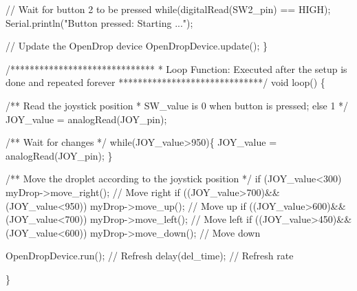 \begin{DoxyCodeInclude}
  // Wait for button 2 to be pressed
  while(digitalRead(SW2\_pin) == HIGH);
  Serial.println("Button pressed: Starting ...");

  // Update the OpenDrop device
  OpenDropDevice.update();
\}

/******************************
 * Loop Function: Executed after the setup is done and repeated forever
 ******************************/
void loop() \{

  /** Read the joystick position
   *  SW\_value is 0 when button is pressed; else 1
   */
  JOY\_value = analogRead(JOY\_pin);

  /** Wait for changes */
  while(JOY\_value>950)\{
   JOY\_value = analogRead(JOY\_pin);
  \}
  
  /** Move the droplet according to the joystick position */
  if  (JOY\_value<300)                     myDrop->move\_right(); // Move right
  if  ((JOY\_value>700)&&(JOY\_value<950))  myDrop->move\_up();    // Move up
  if  ((JOY\_value>600)&&(JOY\_value<700))  myDrop->move\_left();  // Move left
  if  ((JOY\_value>450)&&(JOY\_value<600))  myDrop->move\_down();  // Move down

  OpenDropDevice.run(); // Refresh
  delay(del\_time);      // Refresh rate

\}
\end{DoxyCodeInclude}
 